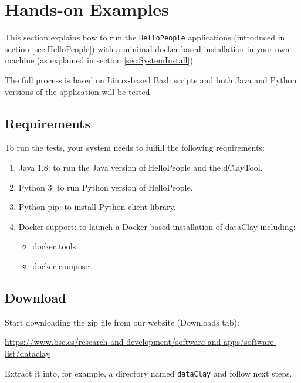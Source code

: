 
\chapter{Hands-on Examples}
\label{sec:FullDemo}

This section explains how to run the \texttt{HelloPeople} applications (introduced in section \ref{sec:HelloPeople}) with a minimal docker-based installation in your own machine (as explained in section \ref{sec:SystemInstall}).

The full process is based on Linux-based Bash scripts and both Java and Python versions of the application will be tested.

\section{Requirements}

To run the tests, your system needs to fulfill the following requirements:

\begin{enumerate}
 \item Java 1.8: to run the Java version of HelloPeople and the dClayTool.
 \item Python 3: to run Python version of HelloPeople.
 \item Python pip: to install Python client library.
 \item Docker support: to launch a Docker-based installation of dataClay including:
 \begin{itemize}
    \item docker tools
    \item docker-compose
 \end{itemize}
\end{enumerate}

\section{Download}
\label{sec:DownloadZIP}

Start downloading the zip file from our website (Downloads tab):\newline

\footnotesize\url{https://www.bsc.es/research-and-development/software-and-apps/software-list/dataclay}\newline

Extract it into, for example, a directory named \texttt{dataClay} and follow next steps.

